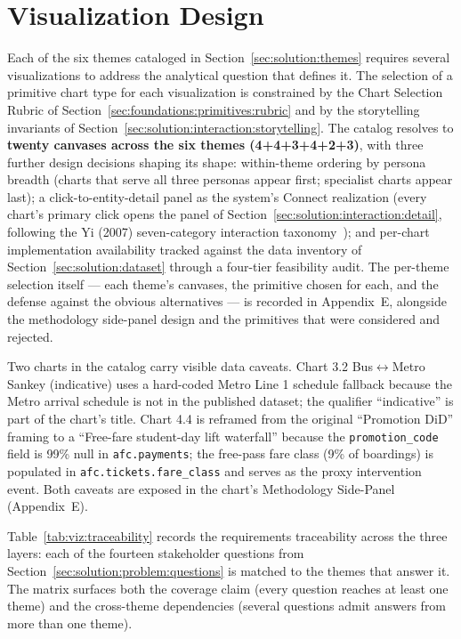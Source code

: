 \section{Visualization Design}
\label{sec:solution:viz}

Each of the six themes cataloged in Section~\ref{sec:solution:themes}
requires several visualizations to address the analytical question
that defines it. The selection of a primitive chart type for each
visualization is constrained by the Chart Selection Rubric of
Section~\ref{sec:foundations:primitives:rubric} and by the storytelling
invariants of Section~\ref{sec:solution:interaction:storytelling}. The
catalog resolves to \textbf{twenty canvases across the six themes
(4+4+3+4+2+3)}, with three further design decisions shaping its shape:
within-theme ordering by persona breadth (charts that serve all three
personas appear first; specialist charts appear last); a click-to-entity-detail
panel as the system's Connect realization (every chart's primary click
opens the panel of Section~\ref{sec:solution:interaction:detail},
following the Yi (2007) seven-category interaction
taxonomy~\cite{yi2007interaction}); and per-chart implementation
availability tracked against the data inventory of
Section~\ref{sec:solution:dataset} through a four-tier feasibility
audit. The per-theme selection itself --- each theme's canvases, the
primitive chosen for each, and the defense against the obvious
alternatives --- is recorded in Appendix~E, alongside the methodology
side-panel design and the primitives that were considered and rejected.

Two charts in the catalog carry visible data caveats. Chart 3.2
Bus$\leftrightarrow$Metro Sankey (indicative) uses a hard-coded
Metro Line 1 schedule fallback because the Metro arrival schedule is
not in the published dataset; the qualifier ``indicative'' is part of
the chart's title. Chart 4.4 is reframed from the original
``Promotion DiD'' framing to a ``Free-fare student-day lift
waterfall'' because the \texttt{promotion\_code} field is 99\% null in
\texttt{afc.payments}; the free-pass fare class (9\% of boardings) is
populated in \texttt{afc.tickets.fare\_class} and serves as the proxy
intervention event. Both caveats are exposed in the chart's
Methodology Side-Panel (Appendix~E).

Table~\ref{tab:viz:traceability} records the requirements traceability
across the three layers: each of the fourteen stakeholder questions
from Section~\ref{sec:solution:problem:questions} is matched to the
themes that answer it. The matrix surfaces both the coverage claim
(every question reaches at least one theme) and the cross-theme
dependencies (several questions admit answers from more than one
theme).

